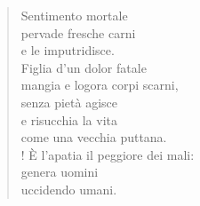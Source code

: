 
\begin{verse}
    Sentimento mortale\\
    pervade fresche carni\\
    e le imputridisce.\\
    Figlia d'un dolor fatale\\
    mangia e logora corpi scarni,\\
    senza pietà agisce\\
    e risucchia la vita\\
    come una vecchia puttana.\\!
    È l'apatia il peggiore dei mali:\\
    genera uomini\\
    uccidendo umani.
\end{verse}